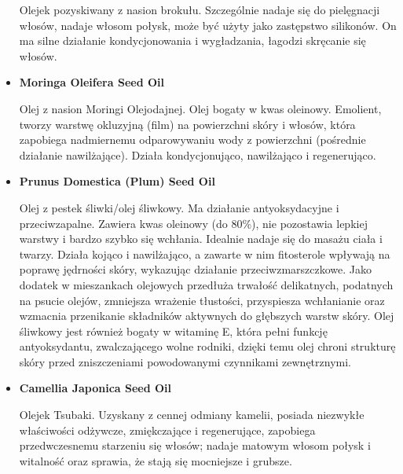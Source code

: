 \begin{itemize}
Olejek pozyskiwany z nasion brokułu. Szczególnie nadaje się do pielęgnacji włosów, nadaje włosom połysk, może być użyty jako zastępstwo silikonów. On ma silne działanie kondycjonowania i wygładzania, łagodzi skręcanie się włosów.

\item \textbf{Moringa Oleifera Seed Oil}

Olej z nasion Moringi Olejodajnej. Olej bogaty w kwas oleinowy. Emolient, tworzy warstwę okluzyjną (film) na powierzchni skóry i włosów, która zapobiega nadmiernemu odparowywaniu wody z powierzchni (pośrednie działanie nawilżające). Działa kondycjonująco, nawilżająco i regenerująco.

\item \textbf{Prunus Domestica (Plum) Seed Oil}

Olej z pestek śliwki/olej śliwkowy. Ma działanie antyoksydacyjne i przeciwzapalne. Zawiera kwas oleinowy (do 80\%), nie pozostawia lepkiej warstwy i bardzo szybko się wchłania. Idealnie nadaje się do masażu ciała i twarzy. Działa kojąco i nawilżająco, a zawarte w nim fitosterole wpływają na poprawę jędrności skóry, wykazując działanie przeciwzmarszczkowe. Jako dodatek w mieszankach olejowych przedłuża trwałość delikatnych, podatnych na psucie olejów, zmniejsza wrażenie tłustości, przyspiesza wchłanianie oraz wzmacnia przenikanie składników aktywnych do głębszych warstw skóry. Olej śliwkowy jest również bogaty w witaminę E, która pełni funkcję antyoksydantu, zwalczającego wolne rodniki, dzięki temu olej chroni strukturę skóry przed zniszczeniami powodowanymi czynnikami zewnętrznymi.

\item \textbf{Camellia Japonica Seed Oil}

Olejek Tsubaki. Uzyskany z cennej odmiany kamelii, posiada niezwykłe właściwości odżywcze, zmiękczające i regenerujące, zapobiega przedwczesnemu starzeniu się włosów; nadaje matowym włosom połysk i witalność oraz sprawia, że stają się mocniejsze i grubsze.





\end{itemize}
